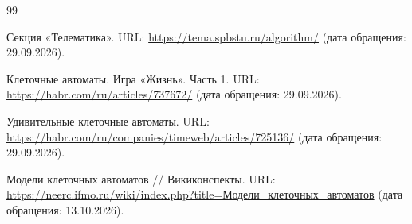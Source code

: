 \begin{thebibliography}{99}

Секция «Телематика». URL: \url{https://tema.spbstu.ru/algorithm/}
(дата обращения: 29.09.2026).

Клеточные автоматы. Игра «Жизнь». Часть 1. URL:
\url{https://habr.com/ru/articles/737672/} (дата обращения: 29.09.2026).

Удивительные клеточные автоматы. URL:
\url{https://habr.com/ru/companies/timeweb/articles/725136/}
(дата обращения: 29.09.2026).

Модели клеточных автоматов // Викиконспекты. URL:
\url{https://neerc.ifmo.ru/wiki/index.php?title=Модели_клеточных_автоматов}
(дата обращения: 13.10.2026).

\end{thebibliography}
